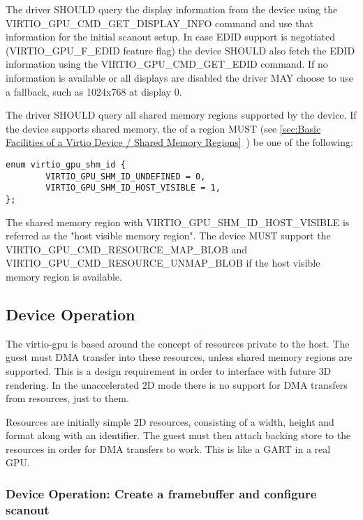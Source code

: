 The driver SHOULD query the display information from the device using
the VIRTIO_GPU_CMD_GET_DISPLAY_INFO command and use that information
for the initial scanout setup.  In case EDID support is negotiated
(VIRTIO_GPU_F_EDID feature flag) the device SHOULD also fetch the EDID
information using the VIRTIO_GPU_CMD_GET_EDID command.  If no
information is available or all displays are disabled the driver MAY
choose to use a fallback, such as 1024x768 at display 0.

The driver SHOULD query all shared memory regions supported by the device.
If the device supports shared memory, the  of a region MUST
(see \ref{sec:Basic Facilities of a Virtio Device /
Shared Memory Regions}~) be one of the following:

\begin{lstlisting}
enum virtio_gpu_shm_id {
        VIRTIO_GPU_SHM_ID_UNDEFINED = 0,
        VIRTIO_GPU_SHM_ID_HOST_VISIBLE = 1,
};
\end{lstlisting}

The shared memory region with VIRTIO_GPU_SHM_ID_HOST_VISIBLE is referred as
the "host visible memory region".  The device MUST support the
VIRTIO_GPU_CMD_RESOURCE_MAP_BLOB and VIRTIO_GPU_CMD_RESOURCE_UNMAP_BLOB
if the host visible memory region is available.

\subsection{Device Operation}\label{sec:Device Types / GPU Device / Device Operation}

The virtio-gpu is based around the concept of resources private to the
host.  The guest must DMA transfer into these resources, unless shared memory
regions are supported. This is a design requirement in order to interface with
future 3D rendering. In the unaccelerated 2D mode there is no support for DMA
transfers from resources, just to them.

Resources are initially simple 2D resources, consisting of a width,
height and format along with an identifier. The guest must then attach
backing store to the resources in order for DMA transfers to
work. This is like a GART in a real GPU.

\subsubsection{Device Operation: Create a framebuffer and configure scanout}

